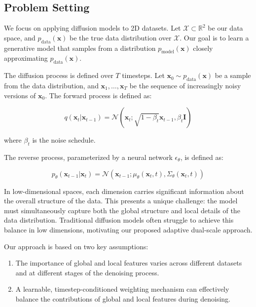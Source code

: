 \documentclass{article} %
\begin{document}
\subsection{Problem Setting}

We focus on applying diffusion models to 2D datasets. Let $\mathcal{X} \subset \mathbb{R}^2$ be our data space, and $p_\text{data}(\mathbf{x})$ be the true data distribution over $\mathcal{X}$. Our goal is to learn a generative model that samples from a distribution $p_\text{model}(\mathbf{x})$ closely approximating $p_\text{data}(\mathbf{x})$.

The diffusion process is defined over $T$ timesteps. Let $\mathbf{x}_0 \sim p_\text{data}(\mathbf{x})$ be a sample from the data distribution, and $\mathbf{x}_1, \ldots, \mathbf{x}_T$ be the sequence of increasingly noisy versions of $\mathbf{x}_0$. The forward process is defined as:

\begin{equation}
    q(\mathbf{x}_t | \mathbf{x}_{t-1}) = \mathcal{N}(\mathbf{x}_t; \sqrt{1 - \beta_t}\mathbf{x}_{t-1}, \beta_t\mathbf{I})
\end{equation}

where $\beta_t$ is the noise schedule.

The reverse process, parameterized by a neural network $\epsilon_\theta$, is defined as:

\begin{equation}
    p_\theta(\mathbf{x}_{t-1} | \mathbf{x}_t) = \mathcal{N}(\mathbf{x}_{t-1}; \mu_\theta(\mathbf{x}_t, t), \Sigma_\theta(\mathbf{x}_t, t))
\end{equation}

In low-dimensional spaces, each dimension carries significant information about the overall structure of the data. This presents a unique challenge: the model must simultaneously capture both the global structure and local details of the data distribution. Traditional diffusion models often struggle to achieve this balance in low dimensions, motivating our proposed adaptive dual-scale approach.

Our approach is based on two key assumptions:
\begin{enumerate}
    \item The importance of global and local features varies across different datasets and at different stages of the denoising process.
    \item A learnable, timestep-conditioned weighting mechanism can effectively balance the contributions of global and local features during denoising.
\end{enumerate}
\end{document}
